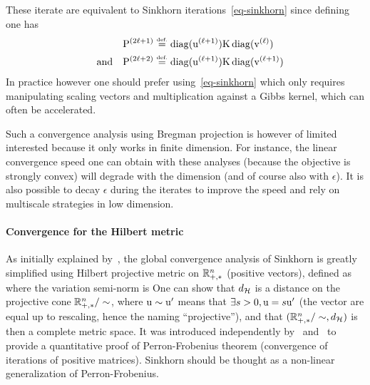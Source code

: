 These iterate are equivalent to Sinkhorn iterations~\eqref{eq-sinkhorn} since defining 
\eq{\label{eq-sink-matrix}\P^{(2\ell)} \eqdef \diag(\it{\uD}) \K \diag(\it{\vD}),}
one has
\begin{align*}
	\mathrm{P}^{(2\ell+1)} &\stackrel{\mbox{\upshape\tiny def.}}{=} \operatorname{diag}(\mathrm{u}^{(\ell+1)}) \mathrm{K} \operatorname{diag}(\mathrm{v}^{(\ell)}) \\
	\quad \text{and} \quad
	\mathrm{P}^{(2\ell+2)} &\stackrel{\mbox{\upshape\tiny def.}}{=} \operatorname{diag}(\mathrm{u}^{(\ell+1)}) \mathrm{K} \operatorname{diag}(\mathrm{v}^{(\ell+1)})
\end{align*}
In practice however one should prefer using~\eqref{eq-sinkhorn} which only requires manipulating scaling vectors and multiplication against a Gibbs kernel, which can often be accelerated. 

Such a convergence analysis using Bregman projection is however of limited interested because it only works in finite dimension. For instance, the linear convergence speed one can obtain with these analyses (because the objective is strongly convex) will degrade with the dimension (and of course also with $\epsilon$). 
%
It is also possible to decay $\epsilon$ during the iterates to improve the speed and rely on multiscale strategies in low dimension.
 



\paragraph{Convergence for the Hilbert metric}

As initially explained by~\cite{franklin1989scaling}, the global convergence analysis of Sinkhorn is greatly simplified using Hilbert projective metric on $\mathbb{R}_{+,*}^n$ (positive vectors), defined as
where the variation semi-norm is
One can show that $d_{\mathcal{H}}$ is a distance on the projective cone $\mathbb{R}_{+,*}^n/\sim$, where $\mathrm{u} \sim \mathrm{u}'$ means that $\exists s>0, \mathrm{u}=s\mathrm{u}'$ (the vector are equal up to rescaling, hence the naming ``projective''), and that $(\mathbb{R}_{+,*}^n/\sim,d_{\mathcal{H}})$ is then a complete metric space.  
%
%
It was introduced independently by~\cite{birkhoff1957extensions} and~\cite{samelson1957perron} to provide a quantitative proof of Perron-Frobenius theorem (convergence of iterations of positive matrices). Sinkhorn should be thought as a non-linear generalization of Perron-Frobenius. 

